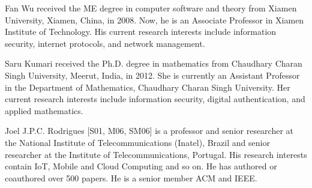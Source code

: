 \documentclass[IEEE JOURNAL OF BIOMEDICAL AND HEALTH INFORMATICS]{IEEEtran}
\begin{document}
\begin{IEEEbiography}{Fan Wu}
received the ME degree in computer software and theory from Xiamen University, Xiamen, China, in 2008. Now, he is an Associate Professor in Xiamen Institute of Technology. His current research interests include
information security, internet protocols, and network management.
\end{IEEEbiography}
\vspace{-1.5cm}
\begin{IEEEbiography}{Saru Kumari}
received the Ph.D. degree in mathematics from Chaudhary Charan Singh University, Meerut, India, in 2012. She is currently an Assistant Professor in the
Department of Mathematics, Chaudhary Charan Singh University. Her current research interests include information security, digital authentication, and applied mathematics.
\end{IEEEbiography}
\vspace{-1.5cm}
\begin{IEEEbiography}
{Joel J.P.C. Rodrigues}
[S01, M06, SM06] is a professor and senior researcher at the National Institute of Telecommunications (Inatel), Brazil and senior researcher at the Institute of Telecommunications, Portugal. His research interests contain IoT, Mobile and Cloud Computing and so on. He has authored or coauthored over 500 papers. He is a senior member ACM and IEEE.

\end{IEEEbiography}
\fi
\end{document}
